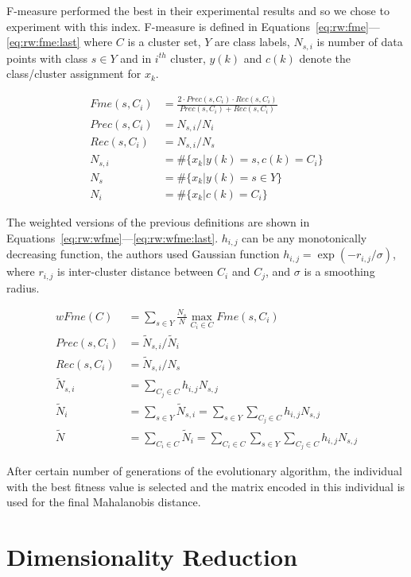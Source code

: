 \mbox{F-measure} performed the best in their experimental results and so we chose to experiment with this index. \mbox{F-measure} is defined in Equations~\ref{eq:rw:fme}---\ref{eq:rw:fme:last} where $C$ is a cluster set, $Y$ are class labels, $N_{s,i}$ is number of data points with class $s \in Y$ and in $i^{th}$ cluster, $y(k)$ and $c(k)$ denote the class/cluster assignment for $x_k$.

\begin{align}
Fme(s,C_i) &= \frac{2 \cdot Prec(s,C_i) \cdot Rec(s, C_i)}{Prec(s,C_i) + Rec(s, C_i)} \label{eq:rw:fme} \\
Prec(s,C_i) &= N_{s,i}/N_i \\
Rec(s,C_i) &= N_{s,i}/N_s \\
N_{s,i} &= \#\{x_k | y(k)=s, c(k)=C_i\} \\
N_s &= \#\{x_k | y(k)=s \in Y\} \\
N_i &= \#\{x_k | c(k)=C_i\} \label{eq:rw:fme:last}
\end{align}

The weighted versions of the previous definitions are shown in Equations~\ref{eq:rw:wfme}---\ref{eq:rw:wfme:last}. $h_{i,j}$ can be any monotonically decreasing function, the authors used Gaussian function $h_{i,j}=\exp(-r_{i,j}/\sigma)$, where $r_{i,j}$ is inter-cluster distance between $C_i$ and $C_j$, and $\sigma$ is a smoothing radius.

\begin{align}
wFme(C) &= \sum_{s \in Y} \frac{N_s}{N} \max_{C_i \in C} Fme(s,C_i) \label{eq:rw:wfme} \\
Prec(s,C_i) &= \widetilde{N}_{s,i}/\widetilde{N}_i \\
Rec(s,C_i) &= \widetilde{N}_{s,i}/N_s \\
\widetilde{N}_{s,i} &= \sum_{C_j \in C} h_{i,j}N_{s,j} \\
\widetilde{N}_i &= \sum_{s\in Y}\widetilde{N}_{s,i}=\sum_{s\in Y}\sum_{C_j \in C} h_{i,j}N_{s,j} \\
\widetilde{N} &= \sum_{C_i \in C}\widetilde{N}_i = \sum_{C_i \in C}\sum_{s\in Y}\sum_{C_j \in C} h_{i,j}N_{s,j} \label{eq:rw:wfme:last}
\end{align}

After certain number of generations of the evolutionary algorithm, the individual with the best fitness value is selected and the matrix encoded in this individual is used for the final Mahalanobis distance.

\section{Dimensionality Reduction}

